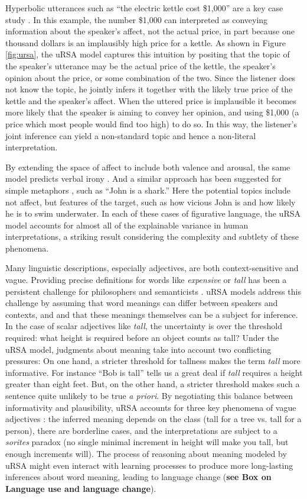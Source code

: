 \documentclass[]{elsarticle}
\begin{document}
Hyperbolic utterances such as ``the
electric kettle cost \$1,000'' are a key case study \citep{kao2014}.
In this example, the number \$1,000 can
interpreted as conveying information about the speaker's affect, not the
actual price, in part because one thousand dollars is an implausibly
high price for a kettle. As shown in Figure \ref{fig:ursa}, the uRSA model  captures this intuition by positing that the topic of the speaker's
utterance may be the actual price of the kettle, the speaker's
opinion about the price, or some combination of the two. Since the listener
does not know the topic, he jointly infers it together with the
likely true price of the kettle and the speaker's affect. When the
uttered price is implausible it becomes more likely that the speaker is aiming to convey her opinion, 
and using \$1,000 (a price which most people would find too high) to do so.
In this way, the listener's joint inference can yield a
non-standard topic and hence a non-literal interpretation.

By extending
the space of affect to include both valence and arousal, the same model predicts verbal irony \citep{kao2015}. 
And a similar approach has been suggested for simple
metaphors \citep{kao2014b}, such as ``John is a shark.''
Here the potential topics include not affect, but features of the
target, such as how vicious John is and how likely he is to swim
underwater. In each of these cases of figurative language, the uRSA model accounts for almost all of the explainable variance in
human interpretations, a striking result considering the complexity and subtlety of these phenomena.

Many linguistic descriptions, especially adjectives, are both context-sensitive and vague. Providing precise definitions for words like \emph{expensive} or \emph{tall} has been a persistent challenge for philosophers and semanticists \citep{williamson2002}. uRSA models address this challenge by assuming that word meanings can differ between speakers and contexts, and and that these meanings themselves can be a subject for inference. In the case of scalar adjectives like \emph{tall}, the uncertainty is over the threshold required: what height is required before an object counts as tall?
Under the uRSA model, judgments about meaning take into account two conflicting pressures: On one hand, a stricter threshold for tallness makes the term \emph{tall} more informative. For instance ``Bob is tall'' tells us a great deal if \emph{tall} requires a height greater than eight feet. But, on the other hand, a stricter threshold makes such a sentence quite unlikely to be true \emph{a priori}.
By negotiating this balance between informativity and plausibility, uRSA accounts for three key phenomena of vague adjectives \citep{lassiter2015}: the inferred meaning depends on the class (tall for a tree vs. tall for a person), there are borderline cases, and the interpretations are subject to a \emph{sorites} paradox (no single minimal increment in height will make you tall, but enough increments will). The process of reasoning about meaning modeled by uRSA might even interact with learning processes to produce more long-lasting inferences about word meaning, leading to language change (\textbf{see Box on Language use and language change}).
\end{document}
